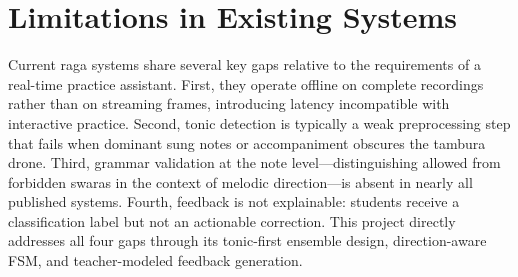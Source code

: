 \documentclass[12pt,a4paper]{report}
\numberwithin{equation}{chapter}
\begin{document}
\section{Limitations in Existing Systems}
Current raga systems share several key gaps relative to the requirements of a real-time practice assistant. First, they operate offline on complete recordings rather than on streaming frames, introducing latency incompatible with interactive practice. Second, tonic detection is typically a weak preprocessing step that fails when dominant sung notes or accompaniment obscures the tambura drone. Third, grammar validation at the note level---distinguishing allowed from forbidden swaras in the context of melodic direction---is absent in nearly all published systems. Fourth, feedback is not explainable: students receive a classification label but not an actionable correction. This project directly addresses all four gaps through its tonic-first ensemble design, direction-aware FSM, and teacher-modeled feedback generation.
\end{document}
